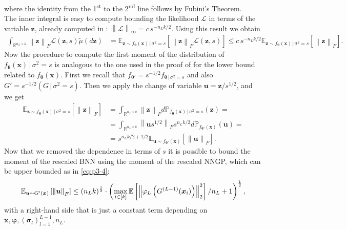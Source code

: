 \documentclass[a4paper, 11pt, reqno]{amsart}
\theoremstyle{plain}
\theoremstyle{remark}
\theoremstyle{definition}
\newcommand{\mean}[2][\kern-0.5pt]{\mathbb{E}_{#1}\left[#2\right]}
\newcommand{\given}{\, | \,}
\newcommand{\real}{\mathbb{R}}
\newcommand{\norm}[1]{\left\lVert#1\right\rVert}
\begin{document}
where the identity from the 1\textsuperscript{st} to the 2\textsuperscript{nd} line follows by Fubini's Theorem. \\
The inner integral is easy to compute bounding the likelihood $\mathcal{L}$ in terms of the variable $\bm{z}$, already computed in : $\norm{\mathcal{L}}_{\infty} = c \, s^{-n_L k / 2}$. Using this result we obtain
\begin{align*}
	\int_{\real^{n_L \times k}} \norm{\bm{z}}_F \mathcal{L}(\bm{z}, s) \widetilde{\mu}(d\bm{z}) & = \mean[\bm{z} \sim f_{\bm{\theta}}(\bm{x}) \given \sigma^2 = s]{\norm{\bm{z}}_F \mathcal{L}(\bm{z}, s)} \leq c \, s^{-n_L k / 2} \mean[\bm{z} \sim f_{\bm{\theta}}(\bm{x}) \given \sigma^2 = s]{\norm{\bm{z}}_F}.
\end{align*}
Now the procedure to compute the first moment of the distribution of $ f_{\bm{\theta}}(\bm{x}) \given \sigma^2 = s$ is analogous to the one used in the proof of  for the lower bound related to $f_{\bm{\theta}}(\bm{x})$.
First we recall that $f_{\bm{\theta}'} = s^{-1/2} f_{\bm{\theta} \given \sigma^2 = s}$ and also $G' = s^{-1/2} (G \given \sigma^2 = s)$.
Then we apply the change of variable $\bm{u} = \bm{z} / s^{1/2}$, and we get
\begin{equation*}
	\begin{aligned}
		\mean[\bm{z} \sim f_{\bm{\theta}}(\bm{x}) \given \sigma^2 = s]{\norm{\bm{z}}_F} & = \int_{\real^{n_L \times k}} \norm{\bm{z}}_F d \mathbb{P}_{f_{\bm{\theta}}(\bm{x}) \given \sigma^2 = s}(\bm{z}) = \\
		& = \int_{\real^{n_L \times k}} \norm{\bm{u} s^{1/2}}_F s^{n_L k / 2} d \mathbb{P}_{f_{\bm{\theta}'}(\bm{x})}(\bm{\bm{u}}) = \\
		& = s^{n_L k / 2 + 1/2} \mean[\bm{u} \sim f_{\bm{\theta}'}(\bm{x})]{\norm{\bm{u}}_F}.
	\end{aligned}
\end{equation*}
Now that we removed the dependence in terms of $s$ it is possible to bound the moment of the rescaled BNN using the moment of the rescaled NNGP, which can be upper bounded as in \cref{eq:p3-4}:
\begin{equation*}
	\mean[\bm{u} \sim G'(\bm{x})]{\norm{\bm{u}}_F} \leq (n_L k)^{\frac{1}{2}} \cdot \left(\max_{i \in [k]} \mean{\norm{\varphi_L\left(G^{(L - 1)}(\bm{x}_i)\right)}_2^2} / n_L + 1\right)^{\frac{1}{2}},
\end{equation*}
with a right-hand side that is just a constant term depending on $\bm{x}, \bm{\varphi}, (\bm{\sigma}_l)_{l = 1}^{L - 1}, n_L$. \\
\end{document}
